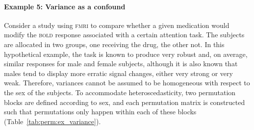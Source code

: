 \paragraph{Example 5: Variance as a confound} Consider a study using \textsc{fmri} to compare whether a given medication would modify the \textsc{bold} response associated with a certain attention task. The subjects are allocated in two groups, one receiving the drug, the other not. In this hypothetical example, the task is known to produce very robust and, on average, similar responses for male and female subjects, although it is also known that males tend to display more erratic signal changes, either very strong or very weak. Therefore, variances cannot be assumed to be homogeneous with respect to the sex of the subjects. To accommodate heteroscedasticity, two permutation blocks are defined according to sex, and each permutation matrix is constructed such that permutations only happen within each of these blocks (Table~\ref{tab:perm:ex_variance}).

